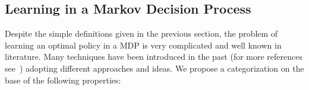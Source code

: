 
\subsection{Learning in a  Markov Decision Process}
	\noindent Despite the simple definitions given in the previous section, the problem of learning an optimal policy in a MDP
	is very complicated and well known in literature. Many techniques have been introduced in the past (for more references see~\cite{sutton1998reinforcement})
	adopting different approaches and ideas. We propose a categorization on the base of the following properties:

